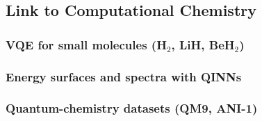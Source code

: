 \subsection{Link to Computational Chemistry} %
\subsubsection{VQE for small molecules (H$_2$, LiH, BeH$_2$)}
\subsubsection{Energy surfaces and spectra with QINNs}
\subsubsection{Quantum-chemistry datasets (QM9, ANI-1)}

